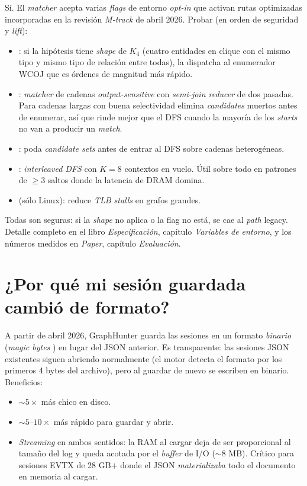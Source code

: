 Sí. El \emph{matcher} acepta varias \emph{flags} de entorno
\emph{opt-in} que activan rutas optimizadas incorporadas en la
revisión \emph{M-track} de abril 2026. Probar (en orden de
seguridad y \emph{lift}):

\begin{itemize}
    \item {}: si la hipótesis
    tiene \emph{shape} de \(K_4\) (cuatro entidades en clique con
    el mismo tipo y mismo tipo de relación entre todas),
    la dispatcha al enumerador WCOJ que es órdenes de magnitud
    más rápido.
    \item {}: \emph{matcher} de
    cadenas \emph{output-sensitive} con \emph{semi-join reducer}
    de dos pasadas. Para cadenas largas con buena selectividad
    elimina \emph{candidates} muertos antes de enumerar, así que
    rinde mejor que el DFS cuando la mayoría de los \emph{starts}
    no van a producir un \emph{match}.
    \item {}: poda \emph{candidate
    sets} antes de entrar al DFS sobre cadenas heterogéneas.
    \item {}: \emph{interleaved DFS} con
    \(K=8\) contextos en vuelo. Útil sobre todo en patrones de
    \(\geq 3\) saltos donde la latencia de DRAM domina.
    \item {} (sólo Linux): reduce
    \emph{TLB stalls} en grafos grandes.
\end{itemize}

Todas son seguras: si la \emph{shape} no aplica o la flag no está,
se cae al \emph{path} legacy. Detalle completo en el libro
\emph{Especificación}, capítulo \emph{Variables de entorno}, y los
números medidos en \emph{Paper}, capítulo \emph{Evaluación}.

\section{¿Por qué mi sesión guardada cambió de formato?}

A partir de abril 2026, GraphHunter guarda las sesiones en un
formato \emph{binario} (\emph{magic bytes} ) en lugar
del JSON anterior. Es transparente: las sesiones JSON existentes
siguen abriendo normalmente (el motor detecta el formato por los
primeros 4 bytes del archivo), pero al guardar de nuevo se
escriben en binario. Beneficios:

\begin{itemize}
    \item $\sim 5\times$ más chico en disco.
    \item $\sim 5\text{--}10\times$ más rápido para guardar y abrir.
    \item \emph{Streaming} en ambos sentidos: la RAM al cargar deja
    de ser proporcional al tamaño del log y queda acotada por el
    \emph{buffer} de I/O ($\sim$8 MB). Crítico para sesiones EVTX
    de 28 GB$+$ donde el JSON \emph{materializaba} todo el
    documento en memoria al cargar.
\end{itemize}

